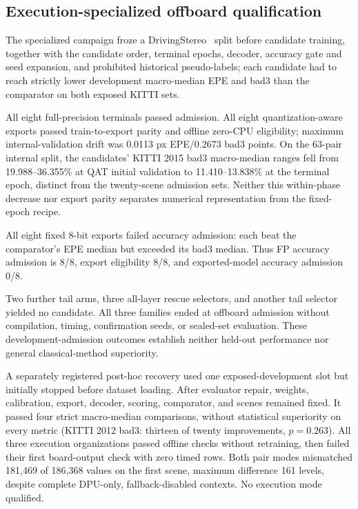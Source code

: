 \documentclass[sigconf,review,anonymous]{acmart}
\begin{document}
\subsection{Execution-specialized offboard qualification}
\label{sec:specialized}
The specialized campaign froze a DrivingStereo~\cite{drivingstereo} split before candidate training, together with the candidate order, terminal epochs, decoder, accuracy gate and seed expansion, and prohibited historical pseudo-labels; each candidate had to reach strictly lower development macro-median EPE and bad3 than the comparator on both exposed KITTI sets.

All eight full-precision terminals passed admission. All eight quantization-aware exports passed train-to-export parity and offline zero-CPU eligibility; maximum internal-validation drift was 0.0113 px EPE/0.2673 bad3 points. On the 63-pair internal split, the candidates' KITTI 2015 bad3 macro-median ranges fell from 19.988--36.355\% at QAT initial validation to 11.410--13.838\% at the terminal epoch, distinct from the twenty-scene admission sets. Neither this within-phase decrease nor export parity separates numerical representation from the fixed-epoch recipe.

All eight fixed 8-bit exports failed accuracy admission: each beat the comparator's EPE median but exceeded its bad3 median. Thus FP accuracy admission is 8/8, export eligibility 8/8, and exported-model accuracy admission 0/8.

Two further tail arms, three all-layer rescue selectors, and another tail selector yielded no candidate. All three families ended at offboard admission without compilation, timing, confirmation seeds, or sealed-set evaluation. These development-admission outcomes establish neither held-out performance nor general classical-method superiority.

A separately registered post-hoc recovery used one exposed-development slot but initially stopped before dataset loading. After evaluator repair, weights, calibration, export, decoder, scoring, comparator, and scenes remained fixed. It passed four strict macro-median comparisons, without statistical superiority on every metric (KITTI 2012 bad3: thirteen of twenty improvements, $p=0.263$). All three execution organizations passed offline checks without retraining, then failed their first board-output check with zero timed rows. Both pair modes mismatched 181,469 of 186,368 values on the first scene, maximum difference 161 levels, despite complete DPU-only, fallback-disabled contexts. No execution mode qualified.
\end{document}
